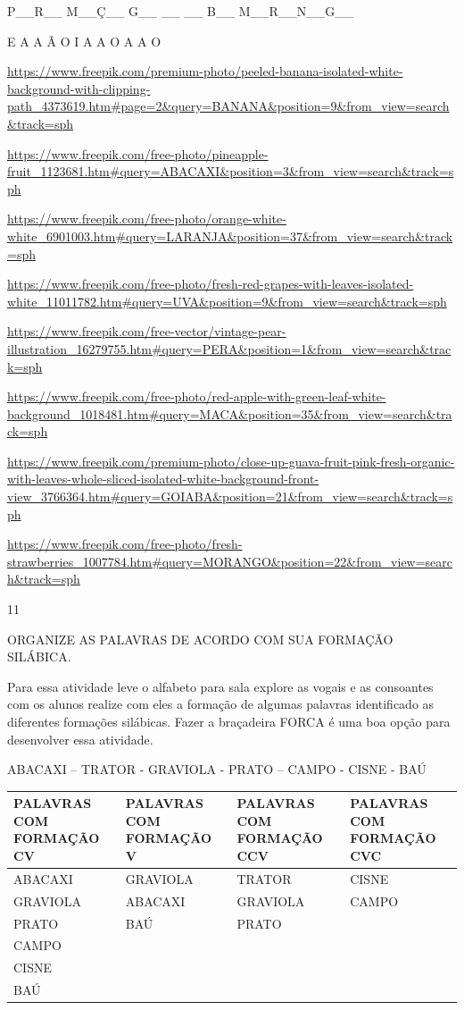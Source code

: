 {{P\_\_R\_\_ M\_\_Ç\_\_ G\_\_ \_\_ \_\_ B\_\_ M\_\_R\_\_N\_\_G\_\_

E A A Ã O I A A O A A O

\url{https://www.freepik.com/premium-photo/peeled-banana-isolated-white-background-with-clipping-path_4373619.htm\#page=2\&query=BANANA\&position=9\&from_view=search\&track=sph}

\url{https://www.freepik.com/free-photo/pineapple-fruit_1123681.htm\#query=ABACAXI\&position=3\&from_view=search\&track=sph}

\url{https://www.freepik.com/free-photo/orange-white-white_6901003.htm\#query=LARANJA\&position=37\&from_view=search\&track=sph}

\url{https://www.freepik.com/free-photo/fresh-red-grapes-with-leaves-isolated-white_11011782.htm\#query=UVA\&position=9\&from_view=search\&track=sph}

\url{https://www.freepik.com/free-vector/vintage-pear-illustration_16279755.htm\#query=PERA\&position=1\&from_view=search\&track=sph}

\url{https://www.freepik.com/free-photo/red-apple-with-green-leaf-white-background_1018481.htm\#query=MACA\&position=35\&from_view=search\&track=sph}

\url{https://www.freepik.com/premium-photo/close-up-guava-fruit-pink-fresh-organic-with-leaves-whole-sliced-isolated-white-background-front-view_3766364.htm\#query=GOIABA\&position=21\&from_view=search\&track=sph}

\url{https://www.freepik.com/free-photo/fresh-strawberries_1007784.htm\#query=MORANGO\&position=22\&from_view=search\&track=sph}

\num{11}

ORGANIZE AS PALAVRAS DE ACORDO COM SUA FORMAÇÃO SILÁBICA.

Para essa atividade leve o alfabeto para sala explore as vogais e as
consoantes com os alunos realize com eles a formação de algumas palavras
identificado as diferentes formações silábicas. Fazer a braçadeira FORCA
é uma boa opção para desenvolver essa atividade.

ABACAXI -- TRATOR - GRAVIOLA - PRATO -- CAMPO - CISNE - BAÚ

\begin{longtable}[]{@{}llll@{}}
\toprule
\textbf{PALAVRAS COM FORMAÇÃO CV} & \textbf{PALAVRAS COM FORMAÇÃO V} &
\textbf{PALAVRAS COM FORMAÇÃO CCV} & \textbf{PALAVRAS COM FORMAÇÃO
CVC}\tabularnewline
\midrule
\endhead
ABACAXI & GRAVIOLA & TRATOR & CISNE\tabularnewline
GRAVIOLA & ABACAXI & GRAVIOLA & CAMPO\tabularnewline
PRATO & BAÚ & PRATO &\tabularnewline
CAMPO & & &\tabularnewline
CISNE & & &\tabularnewline
BAÚ & & &\tabularnewline
\bottomrule
\end{longtable}

}}
